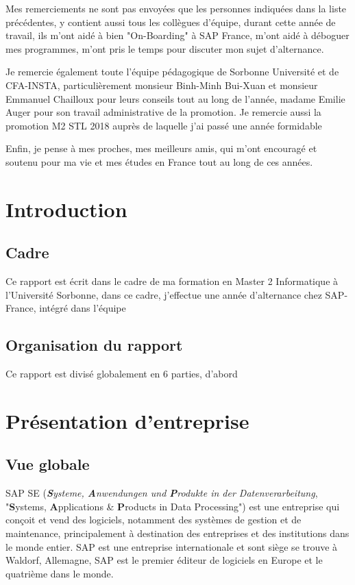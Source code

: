 \documentclass[12pt]{article}
\begin{document}
\par Mes remerciements ne sont pas envoyées que les personnes indiquées dans la liste précédentes, y contient aussi tous les collègues d'équipe, durant cette année de travail, ils m'ont aidé à bien "On-Boarding" à SAP France, m'ont aidé à déboguer mes programmes, m'ont pris le temps pour discuter mon sujet d'alternance. 

\par Je remercie également toute l'équipe pédagogique de Sorbonne Université et de CFA-INSTA, particulièrement monsieur Binh-Minh Bui-Xuan et monsieur Emmanuel Chailloux pour leurs conseils
tout au long de l’année, madame Emilie Auger pour son travail administrative de la promotion. Je remercie aussi la promotion M2 STL 2018 auprès de laquelle j’ai passé une année formidable

\par Enfin, je pense à mes proches, mes meilleurs amis, qui m'ont encouragé et soutenu pour ma vie et mes études en France tout au long de ces années.

\newpage
\section{Introduction}
\subsection{Cadre}
Ce rapport est écrit dans le cadre de ma formation en Master 2 Informatique à l'Université Sorbonne, dans ce cadre, j'effectue une année d'alternance chez SAP-France, intégré dans l'équipe 


\subsection{Organisation du rapport}
Ce rapport est divisé globalement en 6 parties, d'abord 

\newpage
\section{Présentation d'entreprise}

\subsection{Vue globale}
    \par SAP SE (\textit{\textbf{S}ysteme, \textbf{A}nwendungen und \textbf{P}rodukte in der Datenverarbeitung}, "\textbf{S}ystems, \textbf{A}pplications \& \textbf{P}roducts in Data Processing") est une entreprise qui conçoit et vend des logiciels, notamment des systèmes de gestion et de maintenance, principalement à destination des entreprises et des institutions dans le monde entier. SAP est une entreprise internationale et sont siège se trouve à Waldorf, Allemagne, SAP est le premier éditeur de logiciels en Europe et le quatrième dans le monde.
    
\end{document}
